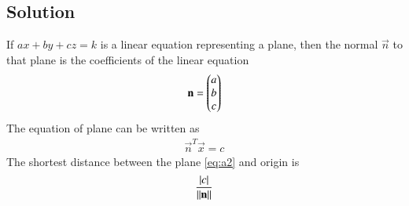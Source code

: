 \documentclass[journal,12pt,twocolumn]{IEEEtran}
\begin{document}
\subsection*{Solution}
If $ax+by+cz=k$ is a linear equation representing a plane, then the normal $\vec{n}$ to that plane is the coefficients of the linear equation
\begin{align}
\mathbf{n} = \begin{pmatrix}a\\b\\c\end{pmatrix}
\end{align}
The equation of plane can be written as
\begin{align}
\vec{n}^T\vec{x} = c
\label{eq:a2}
\end{align}
The shortest distance between the plane \eqref{eq:a2} and origin is 
\begin{align}
\frac{\left\vert c\right\vert}{\left\lVert\mathbf{n}\right\rVert}
\label{eq:a3}
\end{align}
\end{document}
